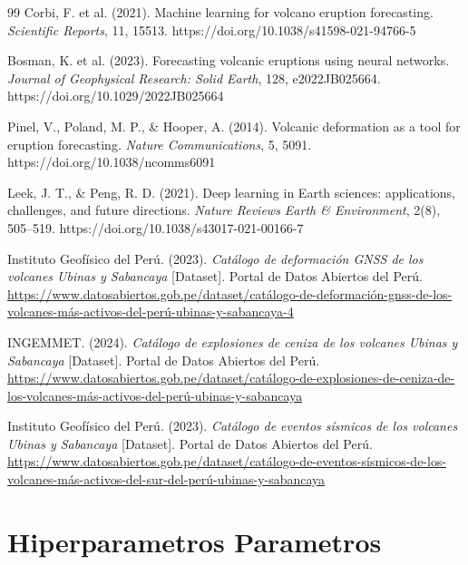 \documentclass[11pt, a4paper, twocolumn]{article}  %
\begin{document}
\begin{thebibliography}{99}
Corbi, F. et al. (2021). Machine learning for volcano eruption forecasting. \textit{Scientific Reports}, 11, 15513. https://doi.org/10.1038/s41598-021-94766-5

Bosman, K. et al. (2023). Forecasting volcanic eruptions using neural networks. \textit{Journal of Geophysical Research: Solid Earth}, 128, e2022JB025664. https://doi.org/10.1029/2022JB025664

Pinel, V., Poland, M. P., \& Hooper, A. (2014). Volcanic deformation as a tool for eruption forecasting. \textit{Nature Communications}, 5, 5091. https://doi.org/10.1038/ncomms6091

Leek, J. T., \& Peng, R. D. (2021). Deep learning in Earth sciences: applications, challenges, and future directions. \textit{Nature Reviews Earth \& Environment}, 2(8), 505–519. https://doi.org/10.1038/s43017-021-00166-7

Instituto Geofísico del Perú. (2023). \textit{Catálogo de deformación GNSS de los volcanes Ubinas y Sabancaya} [Dataset]. Portal de Datos Abiertos del Perú. \url{https://www.datosabiertos.gob.pe/dataset/catálogo-de-deformación-gnss-de-los-volcanes-más-activos-del-perú-ubinas-y-sabancaya-4}

INGEMMET. (2024). \textit{Catálogo de explosiones de ceniza de los volcanes Ubinas y Sabancaya} [Dataset]. Portal de Datos Abiertos del Perú. \url{https://www.datosabiertos.gob.pe/dataset/catálogo-de-explosiones-de-ceniza-de-los-volcanes-más-activos-del-perú-ubinas-y-sabancaya}

Instituto Geofísico del Perú. (2023). \textit{Catálogo de eventos sísmicos de los volcanes Ubinas y Sabancaya} [Dataset]. Portal de Datos Abiertos del Perú. \url{https://www.datosabiertos.gob.pe/dataset/catálogo-de-eventos-sísmicos-de-los-volcanes-más-activos-del-sur-del-perú-ubinas-y-sabancaya}
\end{thebibliography}

\newpage
\appendix


\section{Hiperparametros Parametros}
\end{document}
